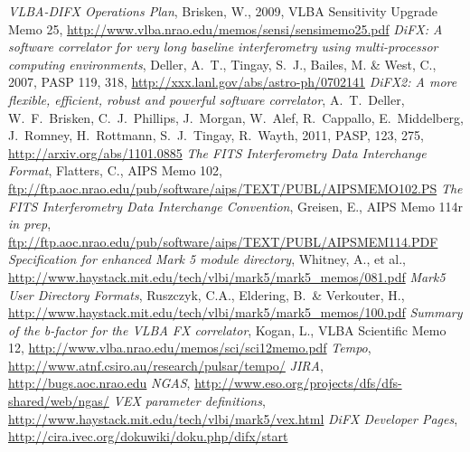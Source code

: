 \begin{thebibliography}{}
	{\it VLBA-DIFX Operations Plan}, Brisken, W., 2009, VLBA Sensitivity Upgrade Memo 25, \url{http://www.vlba.nrao.edu/memos/sensi/sensimemo25.pdf}
	{\it DiFX: A software correlator for very long baseline interferometry using multi-processor computing environments}, Deller, A.~T., Tingay, S.~J., Bailes, M. \& West, C., 2007, PASP 119, 318, \url{http://xxx.lanl.gov/abs/astro-ph/0702141}
	{\it DiFX2: A more flexible, efficient, robust and powerful software correlator}, A.\ T.\ Deller, W.\ F.\ Brisken, C.\ J.\ Phillips, J.\ Morgan, W.\ Alef, R.\ Cappallo, E.\ Middelberg, J.\ Romney, H.\ Rottmann, S.\ J.\ Tingay, R.\ Wayth, 2011, PASP, 123, 275, \url{http://arxiv.org/abs/1101.0885}
	{\it The FITS Interferometry Data Interchange Format}, Flatters, C., AIPS Memo 102, \url{ftp://ftp.aoc.nrao.edu/pub/software/aips/TEXT/PUBL/AIPSMEMO102.PS}
	{\it The FITS Interferometry Data Interchange Convention}, Greisen, E., AIPS Memo 114r {\it in prep}, \url{ftp://ftp.aoc.nrao.edu/pub/software/aips/TEXT/PUBL/AIPSMEM114.PDF}
	{\it Specification for enhanced Mark 5 module directory}, Whitney, A., et al., \url{http://www.haystack.mit.edu/tech/vlbi/mark5/mark5_memos/081.pdf}
	{\it  	Mark5 User Directory Formats}, Ruszczyk, C.A., Eldering, B.\ \& Verkouter, H., \url{http://www.haystack.mit.edu/tech/vlbi/mark5/mark5_memos/100.pdf}
	{\it Summary of the b-factor for the VLBA FX correlator}, Kogan, L., VLBA Scientific Memo 12, \url{http://www.vlba.nrao.edu/memos/sci/sci12memo.pdf}
	{\it Tempo}, \url{http://www.atnf.csiro.au/research/pulsar/tempo/}
	{\it JIRA}, \url{http://bugs.aoc.nrao.edu}
	{\it NGAS}, \url{http://www.eso.org/projects/dfs/dfs-shared/web/ngas/}
	{\it VEX parameter definitions}, \url{http://www.haystack.mit.edu/tech/vlbi/mark5/vex.html}
	{\it DiFX Developer Pages}, \url{http://cira.ivec.org/dokuwiki/doku.php/difx/start}
\end{thebibliography}
